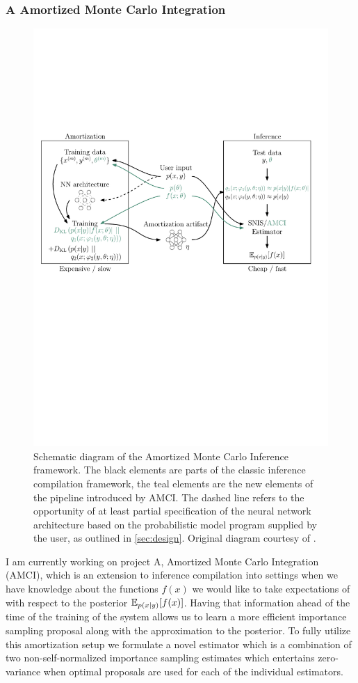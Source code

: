 \documentclass[12pt]{article}
\begin{document}
\subsubsection*{A \quad Amortized Monte Carlo Integration}
\begin{figure}[H]
  \centering
  \includegraphics[width=0.8\linewidth]{figures/diagram.pdf}
  \caption{
  Schematic diagram of the Amortized Monte Carlo Inference framework.
  The black elements are parts of the classic inference compilation framework,
  the teal elements are the new elements of the pipeline introduced by AMCI.
  The dashed line refers to the opportunity of at least partial specification of the neural network architecture based on the probabilistic model program supplied by the user, as outlined in \autoref{sec:design}. 
  Original diagram courtesy of \citet{LeEtAl2016}.}
  \label{fig:amci}
\end{figure}
I am currently working on project A, Amortized Monte Carlo Integration (AMCI), which is an extension to inference compilation into settings when we have knowledge about the functions $f(x)$ we would like to take expectations of with respect to the posterior $\mathbb{E}_{p(x|y)}[f(x)]$.
Having that information ahead of the time of the training of the system allows us to learn a more efficient importance sampling proposal along with the approximation to the posterior.
To fully utilize this amortization setup we formulate a novel estimator which is a combination of two non-self-normalized importance sampling estimates which entertains zero-variance when optimal proposals are used for each of the individual estimators.
\end{document}
